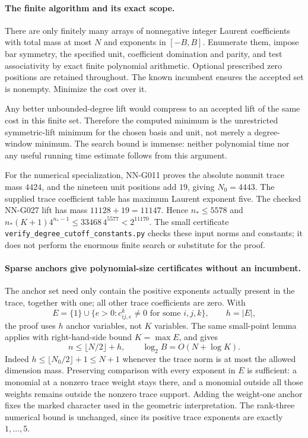 \paragraph{The finite algorithm and its exact scope.}
There are only finitely many arrays of nonnegative integer
Laurent coefficients with total mass at most $N$ and
exponents in $[-B,B]$. Enumerate them, impose bar symmetry,
the specified unit, coefficient domination and parity,
and test associativity by exact finite polynomial
arithmetic. Optional prescribed zero positions are
retained throughout. The known incumbent ensures the
accepted set is nonempty. Minimize the cost over it.

Any better unbounded-degree lift would compress to an
accepted lift of the same cost in this finite set.
Therefore the computed minimum is the unrestricted
symmetric-lift minimum for the chosen basis and unit,
not merely a degree-window minimum. The search bound is
immense: neither polynomial time nor any useful running
time estimate follows from this argument.

For the numerical specialization, NN-G011 proves the
absolute nonunit trace mass $4424$, and the nineteen
unit positions add $19$, giving $N_0=4443$.
The supplied trace coefficient table has maximum
Laurent exponent five. The checked NN-G027 lift has
mass $11128+19=11147$. Hence $n_*\le5578$ and
$n_*(K+1)4^{n_*-1}\le33468\,4^{5577}<2^{11170}$.
The small certificate
\texttt{verify\_degree\_cutoff\_constants.py} checks
these input norms and constants; it does not perform
the enormous finite search or substitute for the proof.

\paragraph{Sparse anchors give polynomial-size certificates without an incumbent.}
The anchor set need only contain the positive exponents
actually present in the trace, together with one; all
other trace coefficients are zero. With
\[
 E=\{1\}\cup\{e>0:c_{ij,e}^k\ne0\text{ for some }i,j,k\},
 \qquad h=|E|,
\]
the proof uses $h$ anchor variables, not $K$ variables.
The same small-point lemma applies with right-hand-side
bound $K=\max E$, and gives
\[
 n\le\lfloor N/2\rfloor+h,\qquad
 \log_2 B=O(N+\log K).                              \tag{G029.7}
\]
Indeed $h\le\lfloor N_0/2\rfloor+1\le N+1$ whenever
the trace norm is at most the allowed dimension mass.
Preserving comparison with every exponent in $E$ is
sufficient: a monomial at a nonzero trace weight stays
there, and a monomial outside all those weights remains
outside the nonzero trace support. Adding the weight-one
anchor fixes the marked character used in the geometric
interpretation. The rank-three numerical bound is unchanged,
since its positive trace exponents are exactly $1,\ldots,5$.

